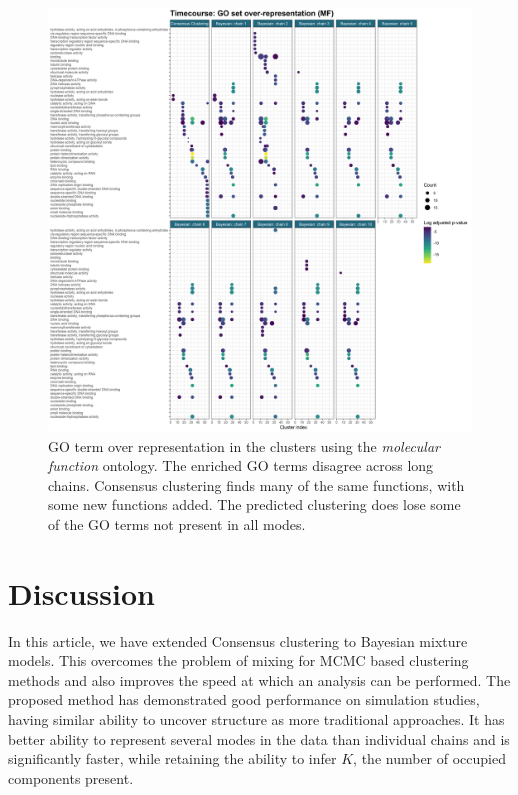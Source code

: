 \documentclass{bioinfo}
\begin{document}
\begin{figure} %
	\centering
	\includegraphics[scale=0.5]{./Images/Yeast/Timecourse/GOoverRepresentationComparisonMF.png}
	\caption{GO term over representation in the clusters using the \emph{molecular function} ontology. The enriched GO terms disagree across long chains. Consensus clustering finds many of the same functions, with some new functions added. The predicted clustering does lose some of the GO terms not present in all modes.}
	\label{fig:yeastGOchains}
\end{figure}

\section{Discussion}

In this article, we have extended Consensus clustering to Bayesian mixture models. This overcomes the problem of mixing for MCMC based clustering methods and also improves the speed at which an analysis can be performed. The proposed method has demonstrated good performance on simulation studies, having similar ability to uncover structure as more traditional approaches. It has better ability to represent several modes in the data than individual chains and is significantly faster, while retaining the ability to infer $K$, the number of occupied components present. 
\end{document}
